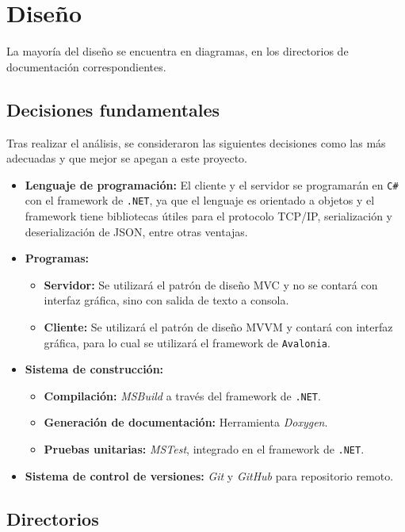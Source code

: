 \chapter{Diseño}

La mayoría del diseño se encuentra en diagramas, en los directorios de documentación correspondientes.

\section{Decisiones fundamentales}

Tras realizar el análisis, se consideraron las siguientes decisiones como las más adecuadas y que mejor se apegan a este proyecto.

\begin{itemize}
	\item \textbf{Lenguaje de programación:} El cliente y el servidor se programarán en \texttt{C\#} con el framework de \texttt{.NET}, ya que el lenguaje es orientado a objetos y el framework tiene bibliotecas útiles para el protocolo TCP/IP, serialización y deserialización de JSON, entre otras ventajas.
	\item \textbf{Programas:}
	\begin{itemize}
		\item \textbf{Servidor:} Se utilizará el patrón de diseño MVC y no se contará con interfaz gráfica, sino con salida de texto a consola.
		\item \textbf{Cliente:} Se utilizará el patrón de diseño MVVM y contará con interfaz gráfica, para lo cual se utilizará el framework de \texttt{Avalonia}.
	\end{itemize}
	\item \textbf{Sistema de construcción:}
	\begin{itemize}
		\item \textbf{Compilación:} \textit{MSBuild} a través del framework de \texttt{.NET}.
		\item \textbf{Generación de documentación:} Herramienta \textit{Doxygen}.
		\item \textbf{Pruebas unitarias:} \textit{MSTest}, integrado en el framework de \texttt{.NET}.

	\end{itemize}
	\item \textbf{Sistema de control de versiones:} \textit{Git} y \textit{GitHub} para repositorio remoto.
\end{itemize}


\section{Directorios}

